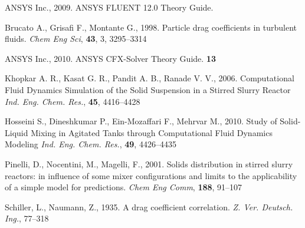 \begin{thebibliography}{99}

 ANSYS Inc., 2009. ANSYS FLUENT 12.0 Theory Guide.


 Brucato A., Grisafi F., Montante G., 1998. Particle drag coefficients in turbulent fluids. \textit{Chem Eng Sci}, \textbf{43}, 3, 3295--3314

 ANSYS Inc., 2010. ANSYS CFX-Solver Theory Guide. \textbf{13}

 Khopkar A. R., Kasat G. R., Pandit A. B., Ranade V. V.,  2006. Computational Fluid Dynamics Simulation of the Solid Suspension in a Stirred Slurry Reactor \textit{Ind. Eng. Chem. Res.}, \textbf{45}, 4416--4428

 Hosseini S., Dineshkumar P., Ein-Mozaffari F., Mehrvar M., 2010. Study of Solid-Liquid Mixing in Agitated Tanks through Computational Fluid Dynamics Modeling \textit{Ind. Eng. Chem. Res.}, \textbf{49}, 4426--4435

 Pinelli, D., Nocentini, M., Magelli, F., 2001. Solids distribution in stirred slurry reactors: in influence of some mixer configurations and limits to the applicability of a simple model for predictions.
\textit{Chem Eng Comm}, \textbf{188}, 91--107

 Schiller, L., Naumann, Z., 1935. A drag coefficient correlation. \textit{Z. Ver. Deutsch. Ing.}, 77--318

\end{thebibliography}
